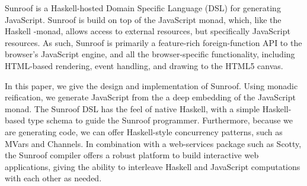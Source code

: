  
Sunroof is a Haskell-hosted Domain Specific Language (DSL) for generating JavaScript.
Sunroof is build on top of the JavaScript monad, which, like the Haskell \IO-monad, allows 
access to external resources, but specifically JavaScript
resources. As such, Sunroof is primarily a feature-rich 
foreign-function API to the browser's JavaScript engine, and all the browser-specific
functionality, including HTML-based rendering, event handling, and 
drawing to the HTML5 canvas. 

In this paper, we give the design and implementation of Sunroof.
Using monadic reification, we generate JavaScript from
the a deep embedding of the JavaScript monad.
The Sunroof DSL has the feel of native Haskell, with a simple
Haskell-based type schema to guide the Sunroof programmer.
Furthermore, because we are generating code,
we can offer Haskell-style concurrency patterns, such as MVars and Channels.
In combination with a web-services package such as Scotty,
the Sunroof compiler offers a robust platform to build interactive web applications,
giving the ability to interleave Haskell and JavaScript computations
with each other as needed.
